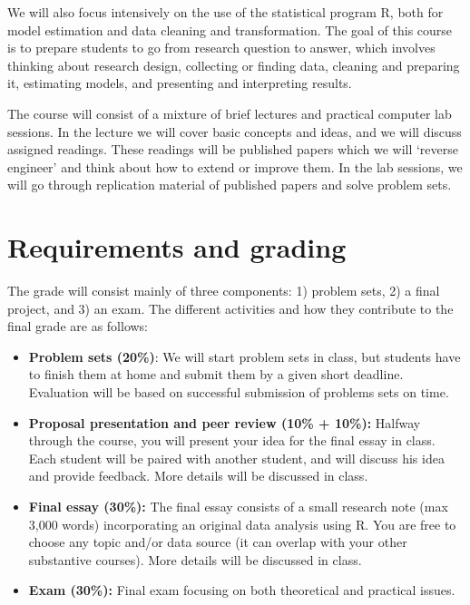 \documentclass[12pt, a4paper]{article}
\begin{document}
We will also focus intensively on the use of the statistical program R, both for model estimation and data cleaning and transformation. The goal of this course is to prepare students to go from research question to answer, which involves thinking about research design, collecting or finding data, cleaning and preparing it, estimating models, and presenting and interpreting results.

The course will consist of a mixture of brief lectures and practical computer lab sessions. In the lecture we will cover basic concepts and ideas, and we will discuss assigned readings. These readings will be published papers which we will `reverse engineer' and think about how to extend or improve them. In the lab sessions, we will go through replication material of published papers and solve problem sets.

\newpage\section{Requirements and grading}

The grade will consist mainly of three components: 1) problem sets, 2) a final project, and 3) an exam. The different activities and how they contribute to the final grade are as follows:

\begin{itemize}
\setlength\itemsep{-5pt}
  \item \textbf{Problem sets (20\%)}: We will start problem sets in class, but students have to finish them at home and submit them by a given short deadline. Evaluation will be based on successful submission of problems sets on time.
  \item \textbf{Proposal presentation and peer review (10\% + 10\%):} Halfway through the course, you will present your idea for the final essay in class. Each student will be paired with another student, and will discuss his idea and provide feedback. More details will be discussed in class.
  \item \textbf{Final essay (30\%):} The final essay consists of a small research note (max 3,000 words) incorporating an original data analysis using R. You are free to choose any topic and/or data source (it can overlap with your other substantive courses). More details will be discussed in class.
  \item \textbf{Exam (30\%):} Final exam focusing on both theoretical and practical issues.
\end{itemize}
\end{document}
